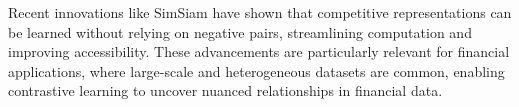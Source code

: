 Recent innovations like SimSiam \cite{chen2021exploring} have shown that competitive representations can be learned without relying on negative pairs, streamlining computation and improving accessibility. These advancements are particularly relevant for financial applications, where large-scale and heterogeneous datasets are common, enabling contrastive learning to uncover nuanced relationships in financial data.


